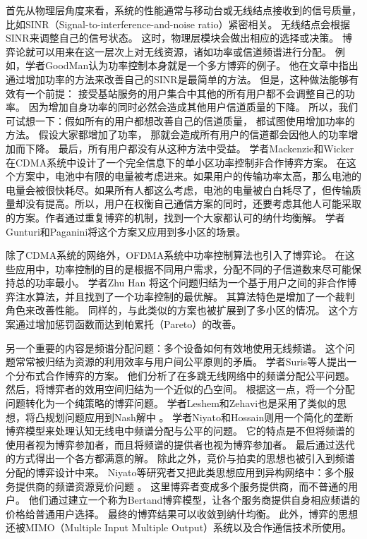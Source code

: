 首先从物理层角度来看，系统的性能通常与移动台或无线结点接收到的信号质量，比如SINR（Signal-to-interference-and-noise ratio）紧密相关。
无线结点会根据SINR来调整自己的信号状态。
这时，物理层模块会做出相应的选择或决策。
博弈论就可以用来在这一层次上对无线资源，诸如功率或信道频谱进行分配。
例如，学者GoodMan认为功率控制本身就是一个多方博弈的例子\cite{GoodmanMandayam:2000}。
他在文章中指出通过增加功率的方法来改善自己的SINR是最简单的方法。
但是，这种做法能够有效有一个前提：
接受基站服务的用户集合中其他的所有用户都不会调整自己的功率。
因为增加自身功率的同时必然会造成其他用户信道质量的下降。
所以，我们可试想一下：假如所有的用户都想改善自己的信道质量，
都试图使用增加功率的方法。
假设大家都增加了功率，
那就会造成所有用户的信道都会因他人的功率增加而下降。
最后，所有用户都没有从这种方法中受益。
学者Mackenzie和Wicker在CDMA系统中设计了一个完全信息下的单小区功率控制非合作博弈方案\cite{MackenzieWiker:2001}。
在这个方案中，电池中有限的电量被考虑进来。如果用户的传输功率太高，那么电池的电量会被很快耗尽。如果所有人都这么考虑，电池的电量被白白耗尽了，但传输质量却没有提高。所以，用户在权衡自己通信方案的同时，还要考虑其他人可能采取的方案。作者通过重复博弈的机制，找到一个大家都认可的纳什均衡解。
学者Gunturi和Paganini将这个方案又应用到多小区的场景\cite{GunturiPaganini:2003}。

除了CDMA系统的网络外，OFDMA系统中功率控制算法也引入了博弈论。
在这些应用中，功率控制的目的是根据不同用户需求，分配不同的子信道数来尽可能保持总的功率最小。
学者Zhu Han 将这个问题归结为一个基于用户之间的非合作博弈注水算法，并且找到了一个功率控制的最优解\cite{HanZhu:2007}。
其算法特色是增加了一个裁判角色来改善性能。
同样的，与此类似的方案也被扩展到了多小区的情况\cite{WangXue:2006}。
这个方案通过增加惩罚函数而达到帕累托（Pareto）的改善。

另一个重要的内容是频谱分配问题：多个设备如何有效地使用无线频谱。
这个问题常常被归结为资源的利用效率与用户间公平原则的矛盾\cite{JiLiu:2007}。
学者Suris等人提出一个分布式合作博弈的方案\cite{SurisDasilva:2007}\cite{SurisDasilva:2009}。
他们分析了在多跳无线网络中的频谱分配公平问题。
然后，将博弈者的效用空间归结为一个近似的凸空间。
根据这一点，将一个分配问题转化为一个纯策略的博弈问题。
学者Leshem和Zehavi也是采用了类似的思想，将凸规划问题应用到Nash解中
\cite{LeshemZehavi:2008}。 学者Niyato和Hossain则用一个简化的垄断博弈模型来处理认知无线电中频谱分配与公平的问题\cite{NiyatoHossain:2008}。
它的特点是不但将频谱的使用者视为博弈参加者，而且将频谱的提供者也视为博弈参加者。
最后通过迭代的方式得出一个各方都满意的解。
除此之外，竞价与拍卖的思想也被引入到频谱分配的博弈设计中来。
Niyato等研究者又把此类思想应用到异构网络中：多个服务提供商的频谱资源竞价问题 \cite{Niyato:2008}。
这里博弈者变成多个服务提供商，而不普通的用户。
他们通过建立一个称为Bertand博弈模型，让各个服务商提供自身相应频谱的价格给普通用户选择。
最终的博弈结果可以收敛到纳什均衡。
此外，博弈的思想还被MIMO（Multiple   Input   Multiple   Output）系统以及合作通信技术所使用\cite{LiangDandekar:2007}\cite{ChenKishore:2008}。

